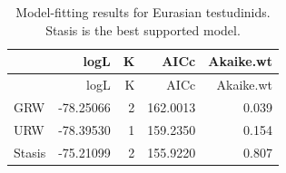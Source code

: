 \begin{longtable}[]{@{}lrrrr@{}}
	\caption[Model fits for Eurasian \T]{Model-fitting results for Eurasian testudinids. Stasis is the best supported model.}
	\label{fig:pTSEs}\tabularnewline
	\toprule
	& logL & K & AICc & Akaike.wt\tabularnewline
	\midrule
	\endfirsthead
	\toprule
	& logL & K & AICc & Akaike.wt\tabularnewline
	\midrule
	\endhead
	GRW & -78.25066 & 2 & 162.0013 & 0.039\tabularnewline
	URW & -78.39530 & 1 & 159.2350 & 0.154\tabularnewline
	Stasis & -75.21099 & 2 & 155.9220 & 0.807\tabularnewline
	\bottomrule
\end{longtable}



\FloatBarrier

